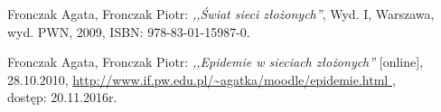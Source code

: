 \begin{thebibliography}{99}

 Fronczak Agata, Fronczak Piotr: \emph{,,Świat sieci złożonych''}, 
\newline Wyd. I, Warszawa, wyd. PWN, 2009, ISBN: 978-83-01-15987-0.

 Fronczak Agata, Fronczak Piotr: \emph{,,Epidemie w sieciach złożonych''} [online],  \\ 28.10.2010,
\url{ http://www.if.pw.edu.pl/~agatka/moodle/epidemie.html } , \\ dostęp: 20.11.2016r.



\end{thebibliography}

\clearpage

